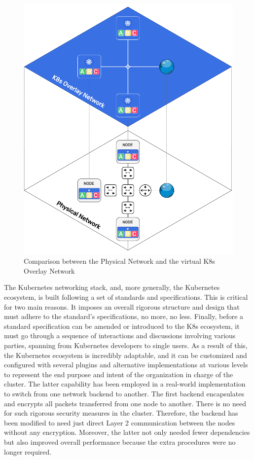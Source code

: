 \begin{figure}[htbp]
  \centering
  \includegraphics[width=.65\textwidth]{images/architecture/overlay_network.pdf}
  \caption{Comparison between the Physical Network and the virtual K8s Overlay Network}
  \label{fig:overlay_network}
\end{figure}

The Kubernetes networking stack, and, more generally, the Kubernetes ecosystem,
is built following a set of standards and specifications. This is critical for two
main reasons. It imposes an overall rigorous structure and design that must
adhere to the standard's specifications, no more, no less. Finally, before a
standard specification can be amended or introduced to the K8s ecosystem, it must
go through a sequence of interactions and discussions involving various parties,
spanning from Kubernetes developers to single users. As a result of this, the
Kubernetes ecosystem is incredibly adaptable, and it can be customized and configured
with several plugins and alternative implementations at various levels to represent
the end purpose and intent of the organization in charge of the cluster. The
latter capability has been employed in a real-world implementation to switch
from one network backend to another. The first backend encapsulates and encrypts
all packets transferred from one node to another. There is no need for such
rigorous security measures in the cluster. Therefore, the backend has been
modified to need just direct Layer 2 communication between the nodes without any
encryption. Moreover, the latter not only needed fewer dependencies but also
improved overall performance because the extra procedures were no longer
required.

